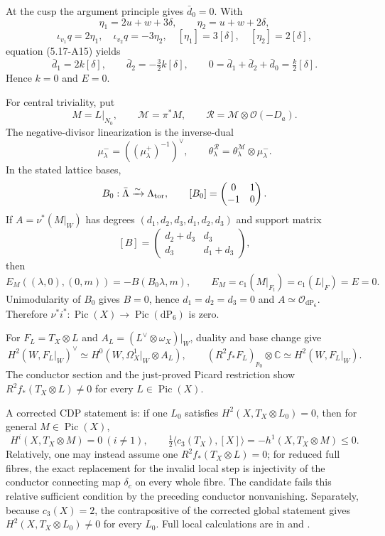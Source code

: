 \documentclass[10pt,letterpaper]{article}
\begin{document}
At the cusp the argument principle gives $\bar d_0=0$.  With
\[
 \eta_1=2u+w+3\delta,\qquad \eta_2=u+w+2\delta,
\]
\[
 \iota_{v_1}q=2\eta_1,\quad
 \iota_{v_2}q=-3\eta_2,\quad
 [\eta_1]=3[\delta],\quad[\eta_2]=2[\delta],
\]
equation (5.17-A15) yields
\[
 \bar d_1=2k[\delta],\qquad
 \bar d_2=-\tfrac32k[\delta],\qquad
 0=\bar d_1+\bar d_2+\bar d_0=\tfrac{k}{2}[\delta].
\]
Hence $k=0$ and $E=0$.

For central triviality, put
\[
 M=L|_{N_0},\qquad \mathcal M=\pi^*M,\qquad
 \mathcal R=\mathcal M\otimes\mathcal O(-D_a).
\]
The negative-divisor linearization is the inverse-dual
\[
 \mu_\lambda^-=((\mu_\lambda^+)^{-1})^\vee,\qquad
 \theta_\lambda^{\mathcal R}
 =\theta_\lambda^{\mathcal M}\otimes\mu_\lambda^-.
\]
In the stated lattice bases,
\[
 B_0:\bar\Lambda\xrightarrow{\sim}\Lambda_{\rm tor},\qquad
 [B_0]=\begin{pmatrix}0&1\\-1&0\end{pmatrix}.
\]
If $A=\nu^*(M|_W)$ has degrees
$(d_1,d_2,d_3,d_1,d_2,d_3)$ and support matrix
\[
 [B]=\begin{pmatrix}d_2+d_3&d_3\\d_3&d_1+d_3\end{pmatrix},
\]
then
\[
 E_M((\lambda,0),(0,m))=-B(B_0\lambda,m),\qquad
 E_M=c_1(M|_{F_t})=c_1(L|_F)=E=0.
\]
Unimodularity of $B_0$ gives $B=0$, hence
$d_1=d_2=d_3=0$ and $A\simeq\mathcal O_{\mathrm{dP}_6}$.  Therefore
$\nu^*i^*:\operatorname{Pic}(X)\to\operatorname{Pic}(\mathrm{dP}_6)$ is
zero.

For $F_L=T_X\otimes L$ and
$A_L=(L^\vee\otimes\omega_X)|_W$, duality and base change give
\[
 H^2(W,F_L|_W)^\vee\simeq
 H^0(W,\Omega_X^1|_W\otimes A_L),\qquad
 (R^2f_*F_L)_{p_0}\otimes\mathbb C\simeq H^2(W,F_L|_W).
\]
The conductor section and the just-proved Picard restriction show
$R^2f_*(T_X\otimes L)\ne0$ for every $L\in\operatorname{Pic}(X)$.

A corrected CDP statement is: if one $L_0$ satisfies
$H^2(X,T_X\otimes L_0)=0$, then for general $M\in\operatorname{Pic}(X)$,
\[
 H^i(X,T_X\otimes M)=0\ (i\ne1),\qquad
 \tfrac12\langle c_3(T_X),[X]\rangle
 =-h^1(X,T_X\otimes M)\le0.
\]
Relatively, one may instead assume one
$R^2f_*(T_X\otimes L)=0$; for reduced full fibres, the exact replacement
for the invalid local step is injectivity of the conductor connecting map
$\delta_c$ on every whole fibre.  The candidate fails this relative
sufficient condition by the preceding conductor nonvanishing.  Separately,
because $c_3(X)=2$, the contrapositive of the corrected global statement gives
$H^2(X,T_X\otimes L_0)\ne0$ for every $L_0$.  Full local calculations are in
and
.
\end{document}
